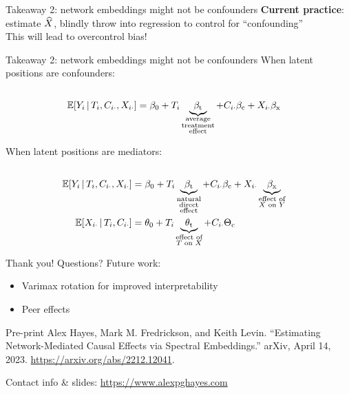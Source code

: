 \documentclass[aspectratio=169]{beamer}
\theoremstyle{remark}
\begin{document}
\begin{frame}{Takeaway 2: network embeddings might not be confounders}
    \centering
    \textbf{Current practice}: estimate $\widehat{X}$, blindly throw into regression to control for ``confounding'' \\
    \vspace{4mm}
    This will lead to overcontrol bias!
\end{frame}

\begin{frame}{Takeaway 2: network embeddings might not be confounders}
    When latent positions are confounders:
    \begin{equation*}
        \begin{aligned}                                                    \\
            \E[T_i, C_{i \cdot}, \X_{i \cdot}]{Y_i}
             & = \betazero + T_i \underbrace{\betat}_{\substack{\text{average} \\ \text{treatment} \\ \text{effect}}} + C_{i \cdot} \betac + \X_{i \cdot} \betax
        \end{aligned}
    \end{equation*}

    When latent positions are mediators:
    \begin{equation*}
        \begin{aligned}                                                    \\
            \E[T_i, C_{i \cdot}, \X_{i \cdot}]{Y_i}
             & = \betazero + T_i \underbrace{\betat}_{\substack{\text{natural}     \\ \text{direct} \\ \text{effect}}} + C_{i \cdot} \betac + \X_{i \cdot} \underbrace{\betax}_{\substack{\text{effect of} \\ \text{$X$ on $Y$}}}  \\
            \E[T_i, C_{i \cdot}]{\X_{i \cdot}}
             & = \thetazero + T_i \underbrace{\thetat}_{\substack{\text{effect of} \\ \text{$T$ on $X$}}}  + C_{i \cdot} \Thetac
        \end{aligned}
    \end{equation*}
\end{frame}

\begin{frame}{Thank you! Questions?}
    Future work:
    \begin{itemize}
        \item Varimax rotation for improved interpretability
        \item Peer effects
    \end{itemize}
    \vspace{4mm}
    \begin{block}{Pre-print}
        Alex Hayes, Mark M. Fredrickson, and Keith Levin. “Estimating Network-Mediated Causal Effects via Spectral Embeddings.” arXiv, April 14, 2023. \url{https://arxiv.org/abs/2212.12041}.
    \end{block}
    \centering
    Contact info \& slides: \href{www.alexpghayes.com}{https://www.alexpghayes.com}
\end{frame}
\end{document}
